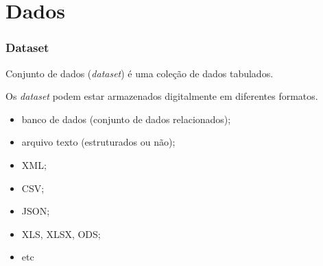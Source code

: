 \section{Dados}

\begin{frame}
\frametitle{Dataset}

Conjunto de dados (\emph{dataset}) é uma coleção de dados tabulados.

\vspace{3ex}
Os \emph{dataset} podem estar armazenados digitalmente em diferentes formatos.
\begin{itemize}
\item banco de dados (conjunto de dados relacionados);
\item arquivo texto (estruturados ou não);
\item XML;
\item CSV;
\item JSON;
\item XLS, XLSX, ODS;
\item etc
\end{itemize}

\end{frame}



